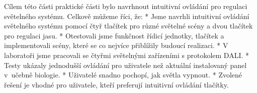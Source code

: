 Cílem této části praktické části bylo navrhnout intuitivní ovládání
pro regulaci světelného systému. Celkově můžeme říci, že:
\begitems
    * Jsme navrhli intuitivní ovládání světelného systému pomocí čtyř tlačítek pro různé světelné scény a dvou tlačítek pro regulaci jasu.
    * Otestovali jsme funkčnost řídicí jednotky, tlačítek a implementovali scény, které se co nejvíce přiblížily budoucí realizaci.
    * V laboratoři jsme pracovali se čtyřmi světelnými zařízeními s protokolem DALI.
    * Testy ukázaly jednodušší ovládání pro uživatele než aktuální instalovaný panel v~učebně biologie.
    * Uživatelé snadno pochopí, jak světla vypnout.
    * Zvolené řešení je vhodné pro uživatele, kteří preferují intuitivní ovládání tlačítky.
\enditems















